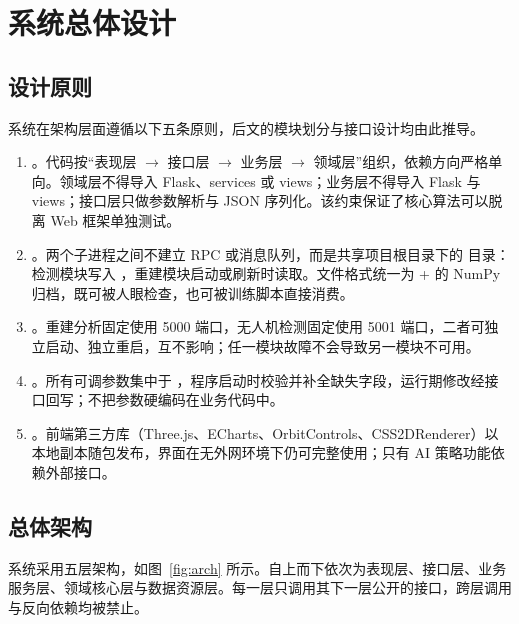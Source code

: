 \section{系统总体设计}

\subsection{设计原则}

系统在架构层面遵循以下五条原则，后文的模块划分与接口设计均由此推导。

\begin{enumerate}
  \item {}。代码按“表现层 $\rightarrow$ 接口层 $\rightarrow$ 业务层 $\rightarrow$ 领域层”组织，依赖方向严格单向。领域层不得导入 Flask、services 或 views；业务层不得导入 Flask 与 views；接口层只做参数解析与 JSON 序列化。该约束保证了核心算法可以脱离 Web 框架单独测试。
  \item {}。两个子进程之间不建立 RPC 或消息队列，而是共享项目根目录下的  目录：检测模块写入 ，重建模块启动或刷新时读取。文件格式统一为  +  的 NumPy 归档，既可被人眼检查，也可被训练脚本直接消费。
  \item {}。重建分析固定使用 5000 端口，无人机检测固定使用 5001 端口，二者可独立启动、独立重启，互不影响；任一模块故障不会导致另一模块不可用。
  \item {}。所有可调参数集中于 ，程序启动时校验并补全缺失字段，运行期修改经接口回写；不把参数硬编码在业务代码中。
  \item {}。前端第三方库（Three.js、ECharts、OrbitControls、CSS2DRenderer）以本地副本随包发布，界面在无外网环境下仍可完整使用；只有 AI 策略功能依赖外部接口。
\end{enumerate}

\subsection{总体架构}

系统采用五层架构，如图~\ref{fig:arch} 所示。自上而下依次为表现层、接口层、业务服务层、领域核心层与数据资源层。每一层只调用其下一层公开的接口，跨层调用与反向依赖均被禁止。

